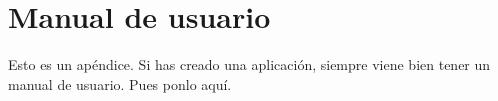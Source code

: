 \documentclass[a4paper, 12pt]{book}
\begin{document}
\cleardoublepage
\appendix
\chapter{Manual de usuario}
\label{app:manual}

Esto es un apéndice.
Si has creado una aplicación, siempre viene bien tener un manual de usuario.
Pues ponlo aquí.


\cleardoublepage


\end{document}
